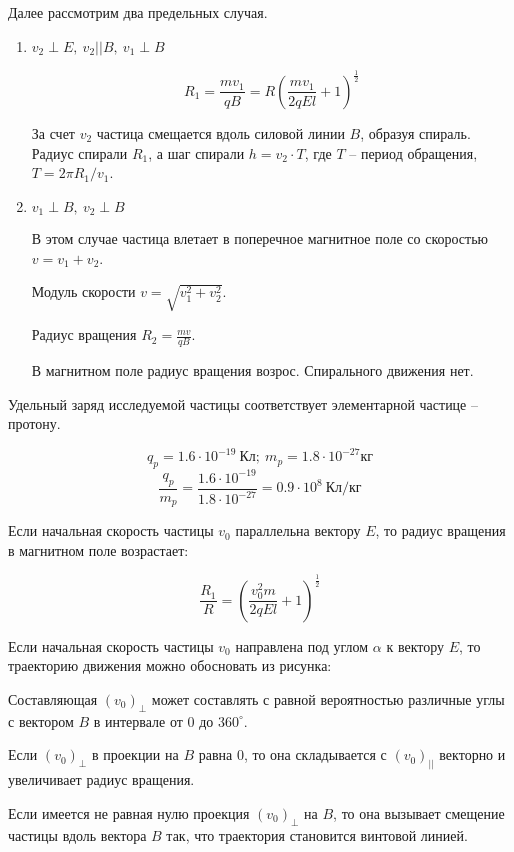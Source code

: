 Далее рассмотрим два предельных случая.

\begin{enumerate}
    \item $v_2 \perp E, \: v_2 || B, \: v_1 \perp B$  

    $$R_1 = \frac{mv_1}{qB} = R \left(\frac{mv_1}{2qEl} + 1\right)^{\frac{1}{2}}$$

    За счет $v_2$ частица смещается вдоль силовой линии $B$, 
    образуя спираль. Радиус спирали $R_1$, а шаг спирали $h=v_2 \cdot T$, 
    где $T$ – период обращения, $T=2 \pi R_1/v_1$.
    \item $v_1 \perp B, \: v_2 \perp B$
    
    В этом случае частица влетает в поперечное магнитное поле со 
    скоростью $v=v_1+v_2$.
    
    Модуль скорости $v=\sqrt{v_1^2 + v_2^2}$.
    
    Радиус вращения $R_2 = \frac{mv}{qB}$.
    
    В магнитном поле радиус вращения возрос. Спирального движения нет.
\end{enumerate}

Удельный заряд исследуемой частицы соответствует элементарной 
частице – протону.

$$q_p=1.6 \cdot 10^{-19} \: \text{Кл}; \: m_p=1.8\cdot 10^{-27} \text{кг}$$
$$\frac{q_p}{m_p}=\frac{1.6\cdot 10^{-19}}{1.8 \cdot 10^{-27}} = 0.9 \cdot 10^8 \: \text{Кл/кг}$$

Если начальная скорость частицы $v_0$ параллельна вектору $E$, то радиус вращения в магнитном поле возрастает:
 
$$\frac{R_1}{R} = \left( \frac{v_0^2m}{2qEl} + 1\right)^{\frac{1}{2}}$$

Если начальная скорость частицы $v_0$ направлена под углом $\alpha$ к вектору $E$, 
то траекторию движения можно обосновать из рисунка:


Составляющая $(v_0)_{\perp}$ может составлять с равной 
вероятностью различные углы с вектором $B$ в интервале от $0$ до $360^\circ$.

Если $(v_0)_{\perp}$ в проекции на $B$ равна $0$, то она 
складывается с $(v_0)_{||}$ векторно и увеличивает радиус 
вращения.

Если имеется не равная нулю проекция $(v_0)_{\perp}$ на $B$, 
то она вызывает смещение частицы вдоль вектора $B$ так, что 
траектория становится винтовой линией.